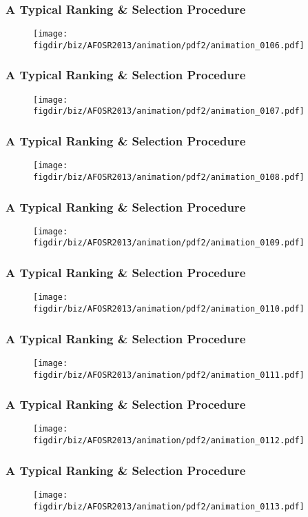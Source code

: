 \documentclass[13pt]{beamer}
\newcommand{\figdir}{../../fig}
\begin{document}
{\begin{frame}\frametitle{A Typical Ranking \& Selection Procedure}\begin{figure}\texttt{[image: \\figdir/biz/AFOSR2013/animation/pdf2/animation\_0106.pdf]}\end{figure}\end{frame}
\begin{frame}\frametitle{A Typical Ranking \& Selection Procedure}\begin{figure}\texttt{[image: \\figdir/biz/AFOSR2013/animation/pdf2/animation\_0107.pdf]}\end{figure}\end{frame}
\begin{frame}\frametitle{A Typical Ranking \& Selection Procedure}\begin{figure}\texttt{[image: \\figdir/biz/AFOSR2013/animation/pdf2/animation\_0108.pdf]}\end{figure}\end{frame}
\begin{frame}\frametitle{A Typical Ranking \& Selection Procedure}\begin{figure}\texttt{[image: \\figdir/biz/AFOSR2013/animation/pdf2/animation\_0109.pdf]}\end{figure}\end{frame}
\begin{frame}\frametitle{A Typical Ranking \& Selection Procedure}\begin{figure}\texttt{[image: \\figdir/biz/AFOSR2013/animation/pdf2/animation\_0110.pdf]}\end{figure}\end{frame}
\begin{frame}\frametitle{A Typical Ranking \& Selection Procedure}\begin{figure}\texttt{[image: \\figdir/biz/AFOSR2013/animation/pdf2/animation\_0111.pdf]}\end{figure}\end{frame}
\begin{frame}\frametitle{A Typical Ranking \& Selection Procedure}\begin{figure}\texttt{[image: \\figdir/biz/AFOSR2013/animation/pdf2/animation\_0112.pdf]}\end{figure}\end{frame}
\begin{frame}\frametitle{A Typical Ranking \& Selection Procedure}\begin{figure}\texttt{[image: \\figdir/biz/AFOSR2013/animation/pdf2/animation\_0113.pdf]}\end{figure}\end{frame}
}
\end{document}
